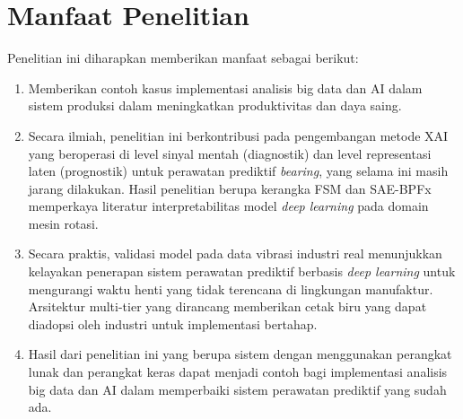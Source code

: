 \section{Manfaat Penelitian}
\label{sec:bab1_manfaat}

{\color{blue}Penelitian ini diharapkan memberikan manfaat sebagai berikut:}

\begin{enumerate}

      \item {\color{blue}Memberikan contoh kasus implementasi analisis
      big data dan AI dalam sistem produksi dalam meningkatkan produktivitas dan daya saing.}

      \item {\color{blue}Secara ilmiah, penelitian ini berkontribusi pada
        pengembangan metode XAI yang beroperasi di level sinyal mentah
        (diagnostik) dan level representasi laten (prognostik) untuk perawatan
        prediktif \emph{bearing}, yang selama ini masih jarang dilakukan.
        Hasil penelitian berupa kerangka FSM dan SAE-BPFx memperkaya
        literatur interpretabilitas model \emph{deep learning} pada domain
        mesin rotasi.}

  \item {\color{blue}Secara praktis, validasi model pada data vibrasi
        industri real menunjukkan kelayakan penerapan
        sistem perawatan prediktif berbasis \emph{deep learning} untuk
        mengurangi waktu henti yang tidak terencana di lingkungan manufaktur.
        Arsitektur multi-tier yang dirancang memberikan cetak biru yang dapat
        diadopsi oleh industri untuk implementasi bertahap.}

   \item {\color{blue}Hasil dari penelitian ini yang berupa sistem 
   dengan menggunakan perangkat lunak dan perangkat keras dapat 
   menjadi contoh bagi implementasi analisis big data dan AI dalam memperbaiki 
   sistem perawatan prediktif yang sudah ada.}

\end{enumerate}


